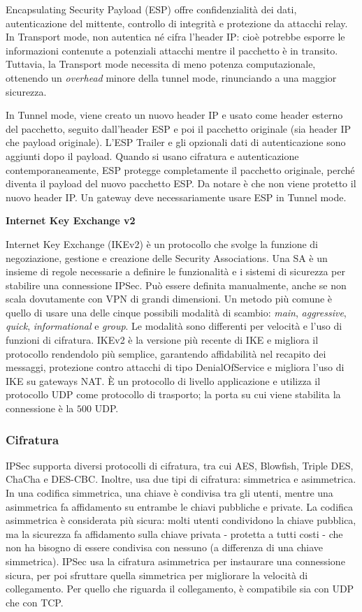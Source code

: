 Encapsulating Security Payload \cite[RFC4303]{RFC4303} (ESP) offre confidenzialità dei dati, autenticazione del mittente, controllo di integrità e protezione da attacchi relay.
In Transport mode, non autentica né cifra l'header IP: cioè potrebbe esporre le informazioni contenute a potenziali attacchi mentre il pacchetto è in transito.
Tuttavia, la Transport mode necessita di meno potenza computazionale, ottenendo un \emph{overhead} minore della tunnel mode, rinunciando a una maggior sicurezza.

In Tunnel mode, viene creato un nuovo header IP e usato come header esterno del pacchetto, seguito dall'header ESP e poi il pacchetto originale (sia header IP che payload originale).
L'ESP Trailer e gli opzionali dati di autenticazione sono aggiunti dopo il payload.
Quando si usano cifratura e autenticazione contemporaneamente, ESP protegge completamente il pacchetto originale, perché diventa il payload del nuovo pacchetto ESP.
Da notare è che non viene protetto il nuovo header IP.
Un gateway deve necessariamente usare ESP in Tunnel mode.

\noindent \textbf{Internet Key Exchange v2}

Internet Key Exchange \cite[RFC4306]{RFC4306} (IKEv2) è un protocollo che svolge la funzione di negoziazione, gestione e creazione delle Security Associations. Una SA è un insieme di regole necessarie a definire le funzionalità e i sistemi di sicurezza per stabilire una connessione IPSec. Può essere definita manualmente, anche se non scala dovutamente con VPN di grandi dimensioni. Un metodo più comune è quello di usare una delle cinque possibili modalità di scambio: \emph{main}, \emph{aggressive}, \emph{quick}, \emph{informational} e \emph{group}.
Le modalità sono differenti per velocità e l'uso di funzioni di cifratura. IKEv2 è la versione più recente di IKE e migliora il protocollo rendendolo più semplice, garantendo affidabilità nel recapito dei messaggi, protezione contro attacchi di tipo DenialOfService e migliora l'uso di IKE su gateways NAT.
È un protocollo di livello applicazione e utilizza il protocollo UDP come protocollo di trasporto; la porta su cui viene stabilita la connessione è la $500$ UDP.

\subsubsection{Cifratura}
IPSec supporta diversi protocolli di cifratura, tra cui AES, Blowfish, Triple DES, ChaCha e DES-CBC. Inoltre, usa due tipi di cifratura: simmetrica e asimmetrica. In una codifica simmetrica, una chiave è condivisa tra gli utenti, mentre una asimmetrica fa affidamento su entrambe le chiavi pubbliche e private. La codifica asimmetrica è considerata più sicura: molti utenti condividono la chiave pubblica, ma la sicurezza fa affidamento sulla chiave privata - protetta a tutti costi - che non ha bisogno di essere condivisa con nessuno (a differenza di una chiave simmetrica).
IPSec usa la cifratura asimmetrica per instaurare una connessione sicura, per poi sfruttare quella simmetrica per migliorare la velocità di collegamento. Per quello che riguarda il collegamento, è compatibile sia con UDP che con TCP.


